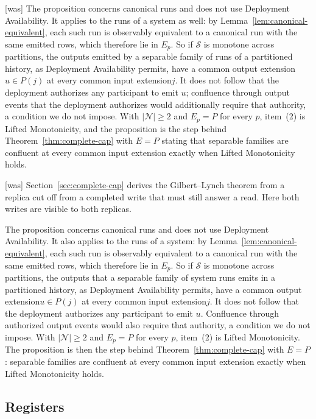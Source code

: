 \documentclass[sigconf]{cidr-2027}
\theoremstyle{remark}
\newcommand{\indesc}{input extension\xspace} %
\newcommand{\outnoun}{output extension\xspace}%
\newcommand{\Spec}{\mathcal{S}}
\newcommand{\fiber}[1]{P(#1)}
\begin{document}
{\footnotesize\color{black!50}\noindent\textsf{[was]} The proposition concerns canonical runs and does not use Deployment
Availability.  It applies to the runs of a system as well: by
Lemma~\ref{lem:canonical-equivalent}, each such run is observably equivalent to
a canonical run with the same emitted rows, which therefore lie in $E_p$.  So if
$\Spec$ is monotone across partitions, the outputs emitted by a separable
family of runs of a partitioned history, as Deployment Availability permits,
have a common \outnoun $u\in\fiber{j}$ at every common \indesc $j$.  It does not follow that the deployment authorizes any
participant to emit $u$; confluence through output events that the deployment
authorizes would additionally require that authority, a condition we do not
impose.  With $|\mathcal N|\ge2$ and $E_p=P$ for every $p$, item~(2) is Lifted
Monotonicity, and the proposition is the step behind
Theorem~\ref{thm:complete-cap} with $E=P$ stating that separable families are confluent
at every common \indesc exactly when Lifted Monotonicity holds.\par}



{\footnotesize\color{black!50}\noindent\textsf{[was]} Section~\ref{sec:complete-cap} derives the Gilbert--Lynch theorem from a
replica cut off from a completed write that must still answer a read.  Here
both writes are visible to both replicas.\par}

\color{blue!70!black}The proposition concerns canonical runs and does not use Deployment
Availability.  It also applies to the runs of a system: by
Lemma~\ref{lem:canonical-equivalent}, each such run is observably equivalent to
a canonical run with the same emitted rows, which therefore lie in $E_p$.  So if
$\Spec$ is monotone across partitions, the outputs that a separable family of
system runs emits in a partitioned history, as Deployment Availability
permits, have a common \outnoun $u\in\fiber{j}$ at every common \indesc $j$.
It does not follow that the deployment authorizes any participant to emit $u$.
Confluence through authorized output events would also require that authority,
a condition we do not impose.  With $|\mathcal N|\ge2$ and $E_p=P$ for every
$p$, item~(2) is Lifted Monotonicity.  The proposition is then the step behind
Theorem~\ref{thm:complete-cap} with $E=P$: separable families are confluent at
every common \indesc exactly when Lifted Monotonicity holds.\color{black}

\subsection{Registers}
\label{app:registers}
\end{document}

